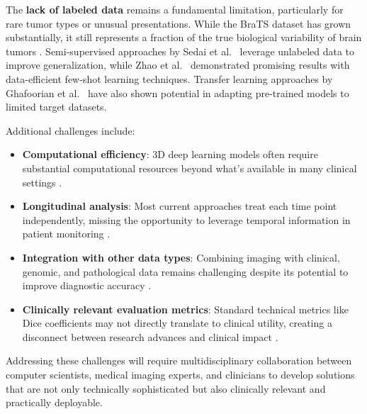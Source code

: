 The \textbf{lack of labeled data} remains a fundamental limitation, particularly for rare tumor types or unusual presentations. While the BraTS dataset has grown substantially, it still represents a fraction of the true biological variability of brain tumors \cite{Bakas2019}. Semi-supervised approaches by Sedai et al.\ \cite{Sedai2019} leverage unlabeled data to improve generalization, while Zhao et al.\ \cite{Zhao2019b} demonstrated promising results with data-efficient few-shot learning techniques. Transfer learning approaches by Ghafoorian et al.\ \cite{Ghafoorian2017} have also shown potential in adapting pre-trained models to limited target datasets.

Additional challenges include:

\begin{itemize}
  \item \textbf{Computational efficiency}: 3D deep learning models often require substantial computational resources beyond what's available in many clinical settings \cite{Kamnitsas2017}.
  \item \textbf{Longitudinal analysis}: Most current approaches treat each time point independently, missing the opportunity to leverage temporal information in patient monitoring \cite{Weninger2018}.
  \item \textbf{Integration with other data types}: Combining imaging with clinical, genomic, and pathological data remains challenging despite its potential to improve diagnostic accuracy \cite{Bakas2019}.
  \item \textbf{Clinically relevant evaluation metrics}: Standard technical metrics like Dice coefficients may not directly translate to clinical utility, creating a disconnect between research advances and clinical impact \cite{MaierHein2018}.
\end{itemize}

Addressing these challenges will require multidisciplinary collaboration between computer scientists, medical imaging experts, and clinicians to develop solutions that are not only technically sophisticated but also clinically relevant and practically deployable.
